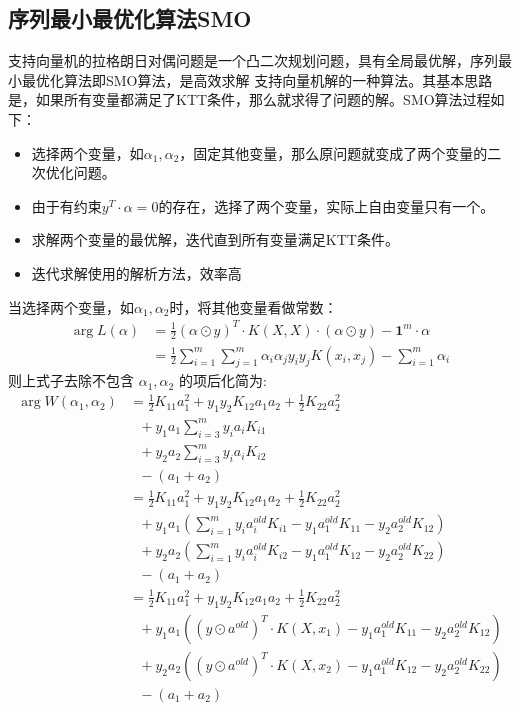 \documentclass[12pt, a4paper, oneside]{ctexart}
\begin{document}
\subsection{序列最小最优化算法SMO}
支持向量机的拉格朗日对偶问题是一个凸二次规划问题，具有全局最优解，序列最小最优化算法即SMO算法，是高效求解
支持向量机解的一种算法。其基本思路是，如果所有变量都满足了KTT条件，那么就求得了问题的解。SMO算法过程如下：
\begin{itemize}
    \item 选择两个变量，如$\alpha_1,\alpha_2$，固定其他变量，那么原问题就变成了两个变量的二次优化问题。
    \item 由于有约束$y^T \cdot \alpha = 0$的存在，选择了两个变量，实际上自由变量只有一个。
    \item 求解两个变量的最优解，迭代直到所有变量满足KTT条件。
    \item 迭代求解使用的解析方法，效率高
\end{itemize}
当选择两个变量，如$\alpha_1,\alpha_2$时，将其他变量看做常数：
\begin{align}
    \mathop{\arg\min_{\alpha}}  L({\alpha}) &= \frac{1}{2}(\alpha \odot y)^T \cdot K(X, X) \cdot (\alpha \odot y) - \boldsymbol{1}^m \cdot \alpha \nonumber \\
    &=  \frac{1}{2} \sum_{i = 1}^{m}\sum_{j = 1}^{m}  {\alpha}_i {\alpha}_j y_i y_j K(x_i, x_j) - \sum_{i = 1}^{m}{\alpha}_i \nonumber
\end{align}
则上式子去除不包含 $\alpha_1,\alpha_2$ 的项后化简为:
\begin{align}
    \mathop{\arg\min_{\alpha_1, \alpha_2}}  W(\alpha_1, \alpha_2) &=  \frac{1}{2}K_{11}a_1^2 + y_1y_2K_{12}a_1a_2  + \frac{1}{2}K_{22}a_2^2 \nonumber \\
        & \ \ \ + y_1a_1\sum_{i = 3}^{m}y_ia_iK_{i1}  \nonumber \\
        & \ \ \ + y_2a_2\sum_{i = 3}^{m} y_ia_iK_{i2} \nonumber \\
        & \ \ \ - (a_1 + a_2) \nonumber \\
        &=  \frac{1}{2}K_{11}a_1^2 + y_1y_2K_{12}a_1a_2  + \frac{1}{2}K_{22}a_2^2 \nonumber \\
        & \ \ \ + y_1a_1(\sum_{i = 1}^{m}y_ia_i^{old}K_{i1}  - y_1a_1^{old}K_{11} - y_2a_2^{old}K_{12} ) \nonumber \\
        & \ \ \ + y_2a_2(\sum_{i = 1}^{m} y_ia_i^{old}K_{i2} - y_1a_1^{old}K_{12} - y_2a_2^{old}K_{22} ) \nonumber \\
        & \ \ \ - (a_1 + a_2) \nonumber \\
        &=  \frac{1}{2}K_{11}a_1^2 + y_1y_2K_{12}a_1a_2  + \frac{1}{2}K_{22}a_2^2 \nonumber \\
        & \ \ \ + y_1a_1((y \odot a^{old})^T \cdot K(X, x_1) - y_1a_1^{old}K_{11} - y_2a_2^{old}K_{12} ) \nonumber \\
        & \ \ \ + y_2a_2((y \odot a^{old})^T \cdot K(X, x_2) - y_1a_1^{old}K_{12} - y_2a_2^{old}K_{22} ) \nonumber \\
        & \ \ \ - (a_1 + a_2) \nonumber 
\end{align}
\end{document}

